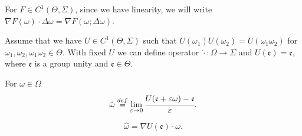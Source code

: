 \documentclass[main.tex]{subfiles}
\begin{document}
For $F\in C^1(\Theta,\Sigma)$, since we have linearity, we will write $\nabla F(\omega)\cdot \Delta\omega = \nabla F(\omega; \Delta\omega)$.

Assume that we have $U\in C^1(\Theta,\Sigma)$ such that $U(\omega_1)U(\omega_2) = U(\omega_1\omega_2)$ for $\omega_1, \omega_2, \omega_1\omega_2\in\Theta$. With fixed $U$ we can define operator $\hat{\cdot}: \Omega\to\Sigma$ and $U(\mathfrak{e}) = \mathfrak{e}$, where $\mathfrak{e}$ is a group unity and $\mathfrak{e}\in\Theta$.

\begin{definition} For $\omega\in \Omega$
\begin{equation}
\hat{\omega} \stackrel{def}{=} \lim_{\epsilon \to 0} \cfrac{U(\mathfrak{e} + \epsilon \omega) - \mathfrak{e}}{\epsilon}.
\end{equation}
\end{definition}

\begin{corollary}
\begin{equation}
\hat{\omega} = \nabla U(\mathfrak{e})\cdot \omega.
\end{equation}
\end{corollary}
\end{document}
